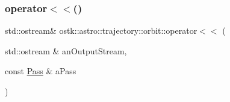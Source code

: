 \subsubsection{\texorpdfstring{operator$<$$<$()}{operator<<()}}
{\footnotesize\ttfamily std\+::ostream\& ostk\+::astro\+::trajectory\+::orbit\+::operator$<$$<$ (\begin{DoxyParamCaption}\item[{std\+::ostream \&}]{an\+Output\+Stream,  }\item[{const \hyperlink{classostk_1_1astro_1_1trajectory_1_1orbit_1_1_pass}{Pass} \&}]{a\+Pass }\end{DoxyParamCaption})}

